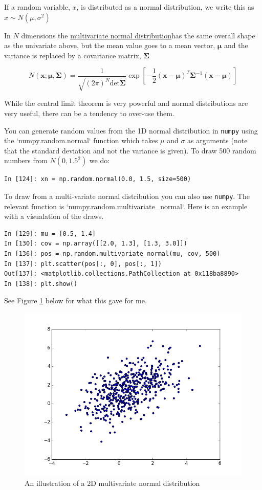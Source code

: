 \documentclass[a4paper,10pt]{article}
\newcommand{\link}[2]{{\color{blue}\href{#1}{#2}}}
\begin{document}
If a random variable, $x$, is distributed as a normal distribution, we write this as $x\sim N(\mu, \sigma^2)$

In $N$ dimensions the \link{https://en.wikipedia.org/wiki/Multivariate_normal_distribution}{multivariate normal distribution}has the same overall shape as the univariate above, but the mean value goes to a mean vector, $\mathbf{\mu}$ and the variance is replaced by a covariance matrix, $\bm{\Sigma}$


$$N(\mathbf{x}; \mathbf{\mu}, \bm{\Sigma})= \frac{1}{\sqrt{ (2\pi)^N \mathrm{det} \bm{\Sigma}}} \exp \left[-\frac{1}{2} (\mathbf{x} - \boldsymbol{\mu})^T  \bm{\Sigma}^{-1} (\mathbf{x} - \boldsymbol{\mu})  \right] $$


While the central limit theorem is very powerful and normal distributions are very useful, there can be a tendency to over-use them.

You can generate random values from the 1D normal distribution in \texttt{numpy} using the `numpy.random.normal` function which takes $\mu$ and $\sigma$ as arguments (note that the standard deviation and not the variance is given). To draw 500 random numbers from $N(0, 1.5^2)$ we do:
\begin{lstlisting}
In [124]: xn = np.random.normal(0.0, 1.5, size=500)
\end{lstlisting}

To draw from a multi-variate normal distribution you can also use \texttt{numpy}. The relevant function is `numpy.random.multivariate\_normal`. Here is an example with a visualation of the draws.
\begin{lstlisting}
In [129]: mu = [0.5, 1.4]
In [130]: cov = np.array([[2.0, 1.3], [1.3, 3.0]])
In [136]: pos = np.random.multivariate_normal(mu, cov, 500)
In [137]: plt.scatter(pos[:, 0], pos[:, 1])
Out[137]: <matplotlib.collections.PathCollection at 0x118ba8890>
In [138]: plt.show()
\end{lstlisting}

See Figure \ref{fig:mgauss} below for what this gave for me.
\begin{figure}[!h]
\includegraphics[width=\textwidth]{multigauss-example.png}
\caption{An illustration of a 2D multivariate normal distribution }
\label{fig:mgauss}
\end{figure}
\end{document}
